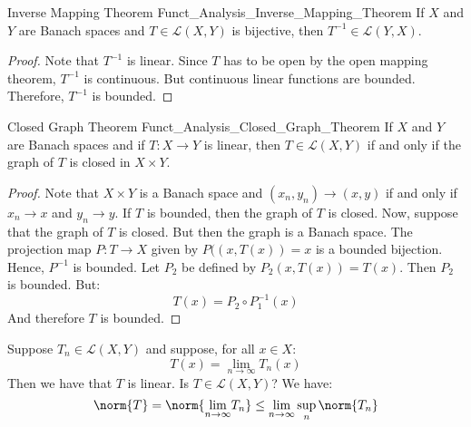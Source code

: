         \begin{ltheorem}{Inverse Mapping Theorem}
              {Funct_Analysis_Inverse_Mapping_Theorem}
            If $X$ and $Y$ are Banach spaces and
            $T\in\mathcal{L}(X,Y)$ is bijective, then
            $T^{\minus{1}}\in\mathcal{L}(Y,X)$.
        \end{ltheorem}
        \begin{proof}
            Note that $T^{\minus{1}}$ is linear. Since $T$ has to be
            open by the open mapping theorem, $T^{\minus{1}}$ is
            continuous. But continuous linear functions are bounded.
            Therefore, $T^{\minus{1}}$ is bounded.
        \end{proof}
        \begin{ltheorem}{Closed Graph Theorem}
              {Funct_Analysis_Closed_Graph_Theorem}
            If $X$ and $Y$ are Banach spaces and if
            $T:X\rightarrow{Y}$ is linear, then
            $T\in\mathcal{L}(X,Y)$ if and only if the graph of
            $T$ is closed in $X\times{Y}$.
        \end{ltheorem}
        \begin{proof}
            Note that $X\times{Y}$ is a Banach space and
            $(x_{n},y_{n})\rightarrow(x,y)$ if and only if
            $x_{n}\rightarrow{x}$ and $y_{n}\rightarrow{y}$.
            If $T$ is bounded, then the graph of $T$ is closed.
            Now, suppose that the graph of $T$ is closed. But
            then the graph is a Banach space. The projection map
            $P:T\rightarrow{X}$ given by $P((x,T(x))=x$ is
            a bounded bijection. Hence, $P^{\minus{1}}$ is bounded.
            Let $P_{2}$ be defined by $P_{2}(x,T(x))=T(x)$. Then
            $P_{2}$ is bounded. But:
            \begin{equation}
                T(x)=P_{2}\circ{P}_{1}^{\minus{1}}(x)
            \end{equation}
            And therefore $T$ is bounded.
        \end{proof}
        \begin{lexample}
            Suppose $T_{n}\in\mathcal{L}(X,Y)$ and suppose, for
            all $x\in{X}$:
            \begin{equation}
                T(x)=\underset{n\rightarrow\infty}{\lim}T_{n}(x)
            \end{equation}
            Then we have that $T$ is linear. Is
            $T\in\mathcal{L}(X,Y)$? We have:
            \begin{equation}
                \norm{T}=
                \norm{\underset{n\rightarrow\infty}{\lim}T_{n}}
                \leq\underset{n\rightarrow\infty}{\lim}\sup_{n}
                \norm{T_{n}}
            \end{equation}
        \end{lexample}
